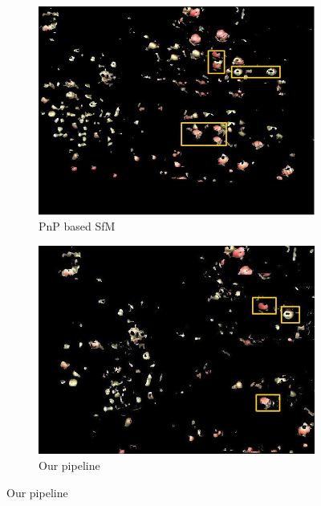 \begin{figure}[!htbp]
\begin{subfigure}[t]{.23\textwidth}
                \includegraphics[width=\textwidth]{figures/isfm/pnpreproj1.jpg}
                \caption{PnP based SfM}
                \label{fig:pnpsfmbase}
        \end{subfigure} \begin{subfigure}[t]{.23\textwidth}
                \includegraphics[width=\textwidth]{figures/isfm/ourreproj.jpg}
                \caption{Our pipeline}
                \label{fig:reconnooverlap}
        \end{subfigure}
        

\end{figure}
